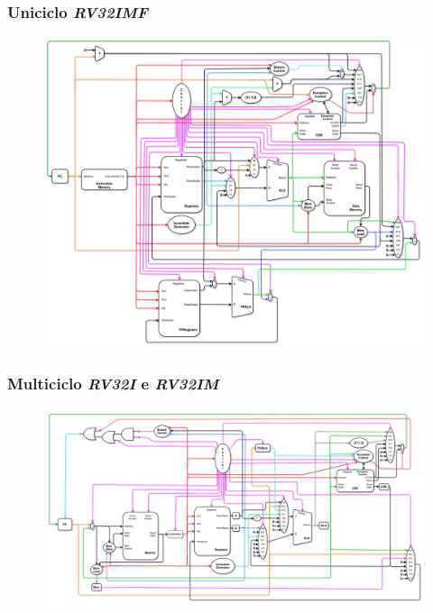 \documentclass[aspectratio=169]{beamer}
\begin{document}
    \begin{frame}
        \frametitle{Uniciclo \textit{RV32IMF}}
        \vfill
        \begin{figure}[H]
        \centering
            \includegraphics[width=.9\textwidth,height=.85\textheight,keepaspectratio]
            {../images/uarch_diagrams/singlecycle-RV32IMF.png}
        \end{figure}
        \vfill
    \end{frame}

    \begin{frame}
        \frametitle{Multiciclo \textit{RV32I} e \textit{RV32IM}}
        \vfill
        \begin{figure}[H]
        \centering
            \includegraphics[width=.95\textwidth,height=.9\textheight,keepaspectratio]
            {../images/uarch_diagrams/multicycle-RV32I-RV32IM.png}
        \end{figure}
        \vfill
    \end{frame}
\end{document}
